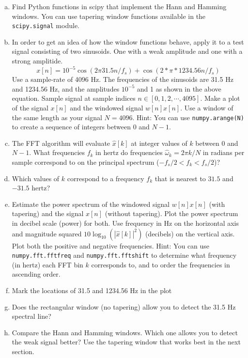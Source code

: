 \begin{enumerate}[a)]
  \item Find Python functions in scipy that implement the Hann and
    Hamming windows.  You can use tapering window functions available
    in the \verb|scipy.signal| module.

  \item In order to get an idea of how the window functions behave,
    apply it to a test signal consisting of two sinusoids. One with a
    weak amplitude and one with a strong amplitide.
        \begin{equation}
          x[n]=10^{-5}\cos(2\pi 31.5  n/f_s) + \cos(2*\pi*1234.56 n/f_s)
        \end{equation}
        Use a sample-rate of 4096 Hz. The frequencies of the sinusoids
        are 31.5 Hz and 1234.56 Hz, and the amplitudes $10^{-5}$ and 1
        as shown in the above equation.  Sample signal at sample
        indices $n\in[0,1,2,\cdots,4095]$. Make a plot of the signal
        $x[n]$ and the windowed signal $w[n]x[n]$. Use a window of the
        same length as your signal $N=4096$. Hint: You can use
        \verb|numpy.arange(N)| to create a sequence of integers
        between $0$ and $N-1$.

  \item The FFT algorithm will evaluate $\hat{x}[k]$ at integer values of $k$ between $0$ and $N-1$.
        What frequencies $f_k$ in hertz do frequencies $\hat{\omega}_k = 2\pi k/N$ in radians per sample
        correspond to on the principal spectrum ($-f_s/2 < f_k < f_s/2$)?

  \item Which values of $k$ correspond to a frequency $f_k$ that is nearest to $31.5$ and $-31.5$ hertz?

  \item Estimate the power spectrum of the windowed signal $w[n]x[n]$
    (with tapering) and the signal $x[n]$ (without tapering). Plot the
    power spectrum in decibel scale (power) for both.  Use frequency
    in Hz on the horizontal axis and magnitude squared $10
    \log_{10}(|\hat{x}[k]|^2)$ (decibels) on the vertical axis.  Plot
    both the positive and negative frequencies. Hint: You can use
    \verb|numpy.fft.fftfreq| and \verb|numpy.fft.fftshift| to
    determine what frequency (in hertz) each FFT bin $k$ corresponds
    to, and to order the frequencies in ascending order.

      \item Mark the locations of 31.5 and 1234.56 Hz in the plot

      \item Does the rectangular window (no tapering) allow you to detect the 31.5 Hz spectral line?
        
      \item Compare the Hann and Hamming windows. Which one allows you
        to detect the weak signal better? Use the tapering window that
        works best in the next section.
\end{enumerate}

